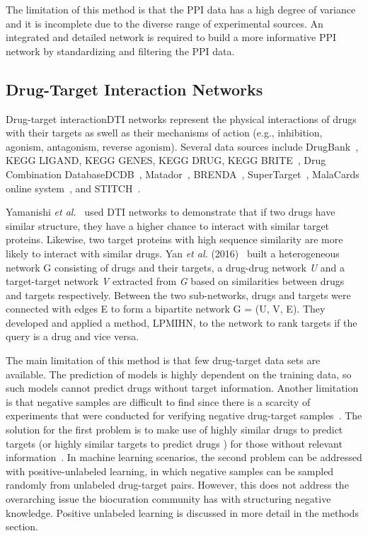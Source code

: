 The limitation of this method is that the PPI data has a high degree of variance and it is incomplete due to the diverse range of experimental sources. An integrated and detailed network is required to build a more informative PPI network by standardizing and filtering the PPI data.

\subsection{Drug-Target Interaction Networks}

Drug-target interaction\ac{DTI} networks represent the physical interactions of drugs with their targets as swell as their mechanisms of action (e.g., inhibition, agonism, antagonism, reverse agonism). Several data sources include DrugBank~\cite{law_drugbank_2014}, KEGG LIGAND, KEGG GENES, KEGG DRUG, KEGG BRITE~\cite{kanehisa_kegg_2019}, Drug Combination Database\ac{DCDB}~\cite{liu_dcdb_2014}, Matador~\cite{gunther_supertarget_2008}, BRENDA~\cite{schomburg_brenda_2002}, SuperTarget~\cite{gunther_supertarget_2008}, MalaCards online system~\cite{rappaport_malacards:_2017}, and \ac{STITCH}~\cite{kuhn_stitch:_2008}.

Yamanishi \textit{et al.}~\cite{yamanishi_prediction_2008} used DTI networks to demonstrate that if two drugs have similar structure, they have a higher chance to interact with similar target proteins. Likewise, two target proteins with high sequence similarity are more likely to interact with similar drugs. Yan \textit{et al.} (2016)~\cite{yan_prediction_2016} built a heterogeneous network G consisting of drugs and their targets, a drug-drug network \textit{U} and a target-target network \textit{V} extracted from \textit{G} based on similarities between drugs and targets respectively. Between the two sub-networks, drugs and targets were connected with edges E to form a bipartite network G = (U, V, E). They developed and applied a method, LPMIHN, to the network to rank targets if the query is a drug and vice versa.

The main limitation of this method is that few drug-target data sets are available. The prediction of models is highly dependent on the training data, so such models cannot predict drugs without target information. Another limitation is that negative samples are difficult to find since there is a scarcity of experiments that were conducted for verifying negative drug-target samples~\cite{chen_semi-supervised_2013}. The solution for the first problem is to make use of highly similar drugs to predict targets (or highly similar targets to predict drugs ) for those without relevant information~\cite{alaimo_recommendation_2016}. In machine learning scenarios, the second problem can be addressed with positive-unlabeled learning, in which negative samples can be sampled randomly from unlabeled drug-target pairs. However, this does not address the overarching issue the biocuration community has with structuring negative knowledge. Positive unlabeled learning is discussed in more detail in the methods section.

